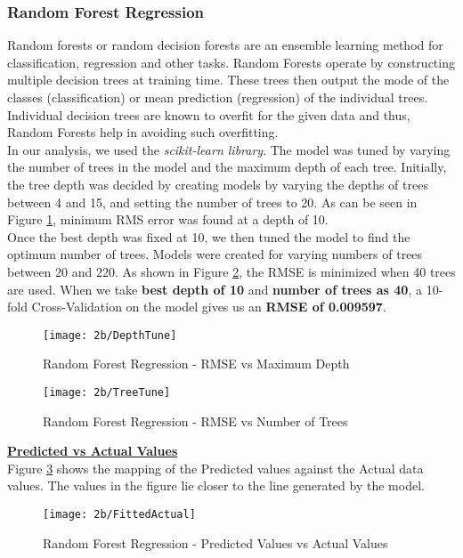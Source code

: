 \documentclass[letterpaper,twocolumn,10pt]{article}
\begin{document}
\subsubsection{Random Forest Regression}
Random forests or random decision forests are an ensemble learning method for classification, regression and other tasks. Random Forests operate by constructing multiple decision trees at training time\cite{RandomForest}. These trees then output the mode of the classes (classification) or mean prediction (regression) of the individual trees. Individual decision trees are known to overfit for the given data and thus, Random Forests help in avoiding such overfitting.\\
In our analysis, we used the \emph{scikit-learn library}. The model was tuned by varying the number of trees in the model and the maximum depth of each tree. Initially, the tree depth was decided by creating models by varying the depths of trees between 4 and  15, and setting the number of trees to 20. As can be seen in Figure \ref{fig:Tuning for depth}, minimum RMS error was found at a depth of 10.\\
Once the best depth was fixed at 10, we then tuned the model to find the optimum number of trees. Models were created for varying numbers of trees between 20 and 220. As shown in Figure \ref{fig:TuningTrees}, the RMSE is minimized when 40 trees are used. 
When we take \textbf{best depth of 10} and \textbf{number of trees as 40}, a 10-fold Cross-Validation on the model gives us an \textbf{RMSE of 0.009597}.
\begin{figure}[H]
  \texttt{[image: 2b/DepthTune]}
  \caption{Random Forest Regression - RMSE vs Maximum Depth}
  \label{fig:Tuning for depth}
\end{figure}
\begin{figure}[H]
  \texttt{[image: 2b/TreeTune]}
  \caption{Random Forest Regression - RMSE vs Number of Trees}
  \label{fig:TuningTrees}
\end{figure}
\textbf{\underline{Predicted vs Actual Values}}\\
Figure \ref{fig:PredictedActual} shows the mapping of the Predicted values against the Actual data values. The values in the figure lie closer to the line generated by the model. 
\begin{figure}[H]
  \texttt{[image: 2b/FittedActual]}
  \caption{Random Forest Regression - Predicted Values vs Actual Values}
  \label{fig:PredictedActual}
\end{figure}
\end{document}
